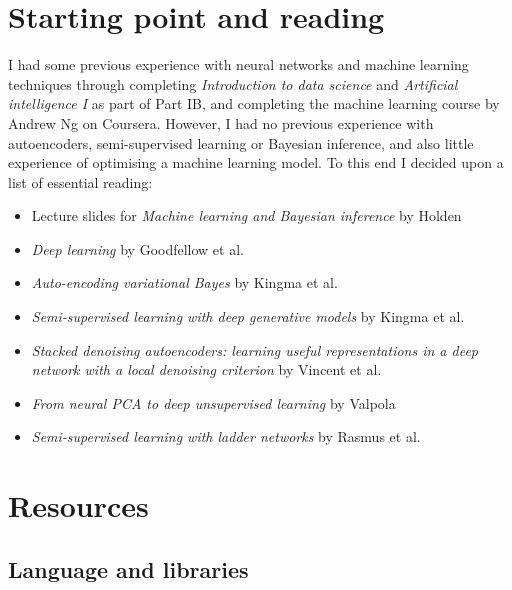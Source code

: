 \documentclass[12pt,a4paper,twoside,openright]{report}
\begin{document}
\section{Starting point and reading} \label{reading}

I had some previous experience with neural networks and machine learning techniques through completing \textit{Introduction to data science}
and \textit{Artificial intelligence I} as part of Part IB, and completing the machine learning course by Andrew Ng on Coursera. However,
I had no previous experience with autoencoders, semi-supervised learning or Bayesian inference, and also little experience of optimising 
a machine learning model. To this end I decided upon a list of essential reading:

\begin{itemize}
  \item Lecture slides for \textit{Machine learning and Bayesian inference} by Holden~\cite{ML_Bayes}
  \item \textit{Deep learning} by Goodfellow et al.~\cite{Goodfellow-et-al-2016}
  \item \textit{Auto-encoding variational Bayes} by Kingma et al.~\cite{DBLP:journals/corr/KingmaW13}
  \item \textit{Semi-supervised learning with deep generative models} by Kingma et al.~\cite{DBLP:journals/corr/KingmaRMW14}
  \item \textit{Stacked denoising autoencoders: learning useful representations in a deep network with a local denoising criterion} by 
        Vincent et al.~\cite{Vincent:2010:SDA:1756006.1953039}
  \item \textit{From neural PCA to deep unsupervised learning} by Valpola~\cite{DBLP:journals/corr/Valpola14}
  \item \textit{Semi-supervised learning with ladder networks} by Rasmus et al.~\cite{DBLP:journals/corr/RasmusVHBR15}
\end{itemize}

\section{Resources}

\subsection{Language and libraries}
\end{document}
